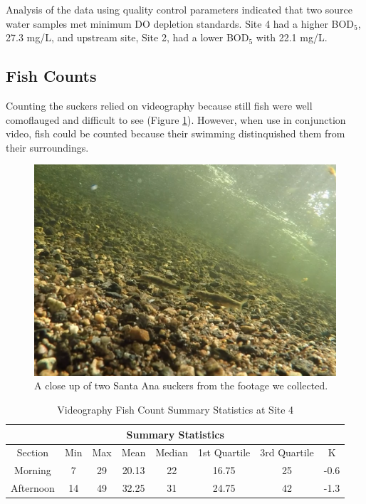 \documentclass{article}\usepackage[]{graphicx}\usepackage[]{color}
\begin{document}
Analysis of the data using quality control parameters indicated that two source water samples met minimum DO depletion standards. Site 4 had a higher BOD$_5$, 27.3 mg/L, and upstream site, Site 2, had a lower BOD$_5$ with 22.1 mg/L. 

\subsection{Fish Counts}

Counting the suckers relied on videography because still fish were well comoflauged and difficult to see (Figure \ref{fig:reallygoodcrop}). However, when use in conjunction video, fish could be counted because their swimming distinquished them from their surroundings.

\begin{figure}
\includegraphics[scale=.4]{Videography_figures/reallygoodcrop}
\caption{A close up of two Santa Ana suckers from the footage we collected.}
\label{fig:reallygoodcrop}
\end{figure}



\begin{table}
\caption{Videography Fish Count Summary Statistics at Site 4}
\begin{tabular}{cccccccc}
 \hline
 \multicolumn{8}{c}{Summary Statistics} \\
 \hline
 Section & Min & Max & Mean & Median & 1st Quartile & 3rd Quartile & K\\
 \hline
 Morning & 7 & 29 & 20.13 & 22  & 16.75 & 25 & -0.6\\
 Afternoon & 14 & 49 & 32.25 & 31 & 24.75 &  42 & -1.3\\
 \hline
\end{tabular}
\label{tab:fishcounts}
\end{table}
\end{document}
